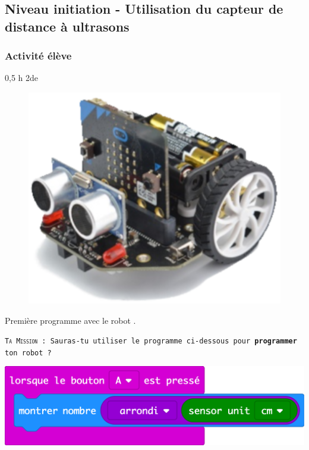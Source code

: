 \newpage


\subsection{Niveau initiation - Utilisation du capteur de distance à ultrasons}

\subsubsection{Activité élève}

\cartouche
{0,5 h}         %
{2de}           %
{}        %
{}     %
{}       %



\begin{figure}
    \includegraphics[width=\linewidth]{res/mini-maqueen.png}
\end{figure}


\begin{eleve}
    Première programme avec le robot \mq.
    
    \texttt{\textsc{Ta Mission} : Sauras-tu utiliser le programme ci-dessous pour \textbf{programmer} ton robot \mq?}
    
    \includegraphics[width=0.5\linewidth]{res/maqueen-fiche1-10.png}
\end{eleve}



